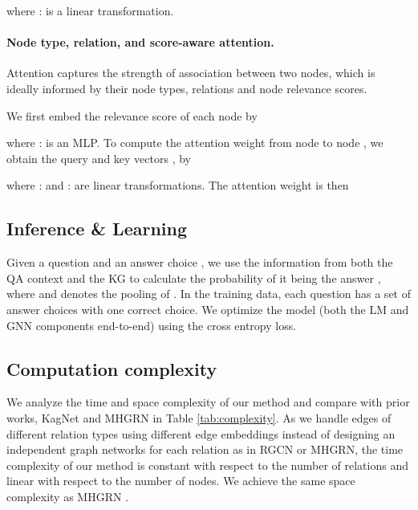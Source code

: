 \documentclass[11pt]{article}
\begin{document}
where :  is a linear transformation.



\paragraph{Node type, relation, and score-aware attention.}
Attention captures the strength of association between two nodes, which 
is ideally informed by their node types, relations and node relevance scores.

\noindent
We first embed the relevance score of each node  by

where :  is an MLP.
To compute the attention weight  from node  to node , we obtain the query and key vectors ,  by

where :  and :  are linear transformations.
The attention weight is then

 



\subsection{Inference \& Learning}
\label{sec:method-inference}
Given a question  and an answer choice , we use the information from both the QA context and the KG to calculate the probability of it being the answer , where  and 
denotes the pooling of . 
In the training data, each question has a set of answer choices with one correct choice. We optimize the model (both the LM and GNN components end-to-end) using the cross entropy loss.


\subsection{Computation complexity}
We analyze the time and space complexity of our method and compare with prior works, KagNet \cite{lin2019kagnet} and MHGRN \cite{feng2020scalable} in Table \ref{tab:complexity}. 
As we handle edges of different relation types using different edge embeddings instead of designing an independent graph networks for each relation as in RGCN \cite{schlichtkrull2018modeling} or MHGRN, the time complexity of our method is constant with respect to the number of relations and linear with respect to the number of nodes. We achieve the same space complexity as MHGRN \cite{feng2020scalable}.
\end{document}
